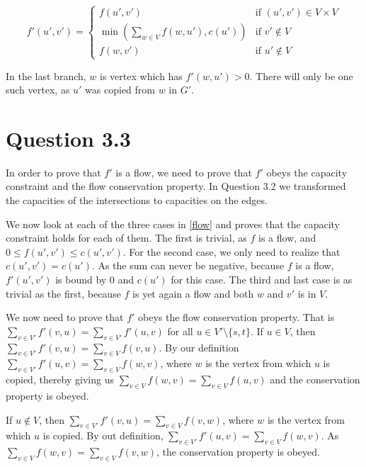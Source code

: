 \documentclass[10pt]{article}
\begin{document}
\begin{equation} 
f'(u',v') = 
\left\{
\begin{array}{ll} 
  f(u', v') & \text{if } (u', v') \in V \times V \\
  \min\left(\sum_{w \in V} f(w, u'), c(u')\right) & \text{if } v' \notin V \\
  f(w,v') & \text{if } u' \notin V
\end{array} 
\right. \label{flow}
\end{equation} 

In the last branch, $w$ is vertex which has $f'(w, u') > 0$.
There will only be one such vertex, as $u'$ was copied from $w$ in $G'$.

\section*{Question 3.3} %
\label{sec:question_3_3}
In order to prove that $f'$ is a flow, we need to prove that $f'$ obeys the capacity constraint  and the flow conservation property. 
In Question 3.2 we transformed the capacities of the intersections to capacities on the edges. 

We now look at each of the three cases in \eqref{flow} and proves that the capacity constraint holds for each of them.
The first is trivial, as $f$ is a flow, and $0 \leq f(u', v') \leq c(u', v')$.
For the second case, we only need to realize that $c(u', v') = c(u')$.
As the sum can never be negative, because $f$ is a flow, $f'(u',v')$ is bound by $0$ and $c(u')$ for this case.
The third and last case is as trivial as the first, because $f$ is yet again a flow and both $w$ and $v'$ is in $V$.

We now need to prove that $f'$ obeys the flow conservation property.
That is $\sum_{v \in V'} f'(v,u) = \sum_{v \in V'} f'(u,v)$ for all $u \in V' \setminus \{s,t\}$.
If $u \in V$, then $\sum_{v \in V'} f'(v, u) = \sum_{v \in V} f(v, u)$.
By our definition $\sum_{v \in V'} f'(u, v) = \sum_{v \in V} f(w, v)$, where $w$ is the vertex from which $u$ is copied, thereby giving us $\sum_{v \in V} f(w, v) = \sum_{v \in V} f(u, v)$ and the conservation property is obeyed.

If $u \notin V$, then $\sum_{v \in V'} f'(v, u) = \sum_{v \in V} f(v, w)$, where $w$ is the vertex from which $u$ is copied.
By out definition, $\sum_{v \in V'} f'(u, v) = \sum_{v \in V} f(w, v)$.
As $\sum_{v \in V} f(w, v) = \sum_{v \in V} f(v, w)$, the conservation property is obeyed.
\end{document}
